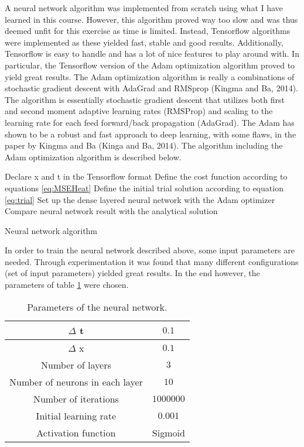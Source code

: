 \documentclass[12pt,a4paper]{article}
\begin{document}
\noindent A neural network algorithm was implemented from scratch using what I have learned in this course. However, this algorithm proved way too slow and was thus deemed unfit for this exercise as time is limited. Instead, Tensorflow algorithms were implemented as these yielded fast, stable and good results. Additionally, Tensorflow is easy to handle and has a lot of nice features to play around with. In particular, the Tensorflow version of the Adam optimization algorithm proved to yield great results. The Adam optimization algorithm is really a combinations of stochastic gradient descent with AdaGrad and RMSprop (Kingma and Ba, 2014). The algorithm is essentially stochastic gradient descent that utilizes both first and second moment adaptive learning rates (RMSProp) and scaling to the learning rate for each feed forward/back propagation (AdaGrad). The Adam has shown to be a robust and fast approach to deep learning, with some flaws, in the paper by Kingma and Ba (Kinga and Ba, 2014). The algorithm including the Adam optimization algorithm is described below.

\begin{algorithm}[H]
\SetAlgoLined
{}
 Declare x and t in the Tensorflow format\;
 Define the cost function according to equations \ref{eq:MSEHeat}\;
 Define the initial trial solution according to equation \ref{eq:trial}\;
 Set up the dense layered neural network with the Adam optimizer\;
  Compare neural network result with the analytical solution
 \caption{Neural network algorithm}
\end{algorithm}

\noindent In order to train the neural network described above, some input parameters are needed. Through experimentation it was found that many different configurations (set of input parameters) yielded great results. In the end however, the parameters of table \ref{tab:NNparams} were chosen.

\begin{table}[h]
\caption{\label{tab:NNparams} Parameters of the neural network.}
\centering
\begin{tabular}{|c|c|}
\hline
$\Delta$ t & $0.1$\\
\hline
$\Delta$ x & $0.1$\\
\hline
Number of layers & $3$\\
\hline
Number of neurons in each layer & $10$\\
\hline
Number of iterations & $1000000$\\
\hline
Initial learning rate & $0.001$\\
\hline
Activation function & Sigmoid\\
\hline
\end{tabular}
\end{table}
\end{document}

